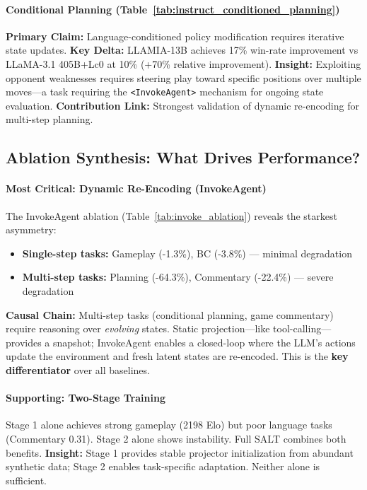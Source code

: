 \paragraph{Conditional Planning (Table~\ref{tab:instruct_conditioned_planning})}
\textbf{Primary Claim:} Language-conditioned policy modification requires iterative state updates.
\textbf{Key Delta:} LLAMIA-13B achieves 17\% win-rate improvement vs LLaMA-3.1 405B+Lc0 at 10\% (+70\% relative improvement).
\textbf{Insight:} Exploiting opponent weaknesses requires steering play toward specific positions over multiple moves—a task requiring the \texttt{<InvokeAgent>} mechanism for ongoing state evaluation.
\textbf{Contribution Link:} Strongest validation of dynamic re-encoding for multi-step planning.

\subsection{Ablation Synthesis: What Drives Performance?}

\paragraph{Most Critical: Dynamic Re-Encoding (InvokeAgent)}
The InvokeAgent ablation (Table~\ref{tab:invoke_ablation}) reveals the starkest asymmetry:
\begin{itemize}[leftmargin=*, itemsep=1pt]
    \item \textbf{Single-step tasks:} Gameplay (-1.3\%), BC (-3.8\%) — minimal degradation
    \item \textbf{Multi-step tasks:} Planning (-64.3\%), Commentary (-22.4\%) — severe degradation
\end{itemize}
\textbf{Causal Chain:} Multi-step tasks (conditional planning, game commentary) require reasoning over \textit{evolving} states. Static projection—like tool-calling—provides a snapshot; InvokeAgent enables a closed-loop where the LLM's actions update the environment and fresh latent states are re-encoded. This is the \textbf{key differentiator} over all baselines.

\paragraph{Supporting: Two-Stage Training}
Stage 1 alone achieves strong gameplay (2198 Elo) but poor language tasks (Commentary 0.31). Stage 2 alone shows instability. Full SALT combines both benefits.
\textbf{Insight:} Stage 1 provides stable projector initialization from abundant synthetic data; Stage 2 enables task-specific adaptation. Neither alone is sufficient.

